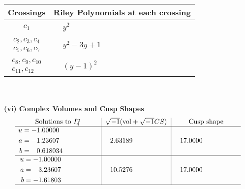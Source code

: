 \documentclass[1p]{elsarticle_modified}
\theoremstyle{definition}
\newcommand{\I}{\sqrt{-1}}
\begin{document}
\begin{tabular}{m{50pt}|m{274pt}}
Crossings & \hspace{64pt}Riley Polynomials at each crossing \\
\hline $$\begin{aligned}c_{1}\end{aligned}$$&$\begin{aligned}
&y^2
\end{aligned}$\\
\hline $$\begin{aligned}c_{2},c_{3},c_{4}\\c_{5},c_{6},c_{7}\end{aligned}$$&$\begin{aligned}
&y^2-3 y+1
\end{aligned}$\\
\hline $$\begin{aligned}c_{8},c_{9},c_{10}\\c_{11},c_{12}\end{aligned}$$&$\begin{aligned}
&(y-1)^2
\end{aligned}$\\
\hline
\end{tabular}\\~\\
\newpage\flushleft \textbf{(vi) Complex Volumes and Cusp Shapes}
$$\begin{array}{c|c|c}  
\text{Solutions to }I^u_{4}& \I (\text{vol} + \sqrt{-1}CS) & \text{Cusp shape}\\
 \hline 
\begin{aligned}
u &= -1.00000\phantom{ +0.000000I} \\
a &= -1.23607\phantom{ +0.000000I} \\
b &= \phantom{-}0.618034\phantom{ +0.000000I}\end{aligned}
 & \phantom{-}2.63189\phantom{ +0.000000I} & \phantom{-}17.0000\phantom{ +0.000000I} \\ \hline\begin{aligned}
u &= -1.00000\phantom{ +0.000000I} \\
a &= \phantom{-}3.23607\phantom{ +0.000000I} \\
b &= -1.61803\phantom{ +0.000000I}\end{aligned}
 & \phantom{-}10.5276\phantom{ +0.000000I} & \phantom{-}17.0000\phantom{ +0.000000I}\\
 \hline 
 \end{array}$$\newpage
\newpage\renewcommand{\arraystretch}{1}
\end{document}
